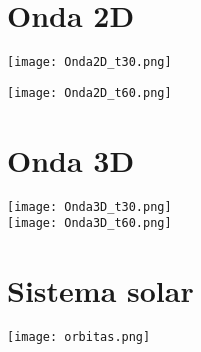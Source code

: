 \documentclass[paper=a4, fontsize=11pt]{scrartcl} %
\begin{document}


\section{Onda 2D}
\texttt{[image: Onda2D\_t30.png]}

\texttt{[image: Onda2D\_t60.png]}

\section{Onda 3D}
\texttt{[image: Onda3D\_t30.png]}\\
\texttt{[image: Onda3D\_t60.png]}

\section{Sistema solar}
\texttt{[image: orbitas.png]}
\end{document}
